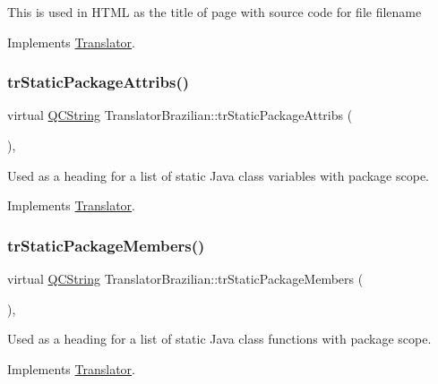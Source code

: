 This is used in H\+T\+ML as the title of page with source code for file filename 

Implements \mbox{\hyperlink{class_translator}{Translator}}.

\mbox{\label{class_translator_brazilian_a4634da2061caccc8ed01f57170d3cce8}} 
\subsubsection{\texorpdfstring{trStaticPackageAttribs()}{trStaticPackageAttribs()}}
{\footnotesize\ttfamily virtual \mbox{\hyperlink{class_q_c_string}{Q\+C\+String}} Translator\+Brazilian\+::tr\+Static\+Package\+Attribs (\begin{DoxyParamCaption}{ }\end{DoxyParamCaption})\hspace{0.3cm}{\ttfamily [inline]}, {\ttfamily [virtual]}}

Used as a heading for a list of static Java class variables with package scope. 

Implements \mbox{\hyperlink{class_translator}{Translator}}.

\mbox{\label{class_translator_brazilian_af5f927eecc1b80f7e193fa5243758acb}} 
\subsubsection{\texorpdfstring{trStaticPackageMembers()}{trStaticPackageMembers()}}
{\footnotesize\ttfamily virtual \mbox{\hyperlink{class_q_c_string}{Q\+C\+String}} Translator\+Brazilian\+::tr\+Static\+Package\+Members (\begin{DoxyParamCaption}{ }\end{DoxyParamCaption})\hspace{0.3cm}{\ttfamily [inline]}, {\ttfamily [virtual]}}

Used as a heading for a list of static Java class functions with package scope. 

Implements \mbox{\hyperlink{class_translator}{Translator}}.

